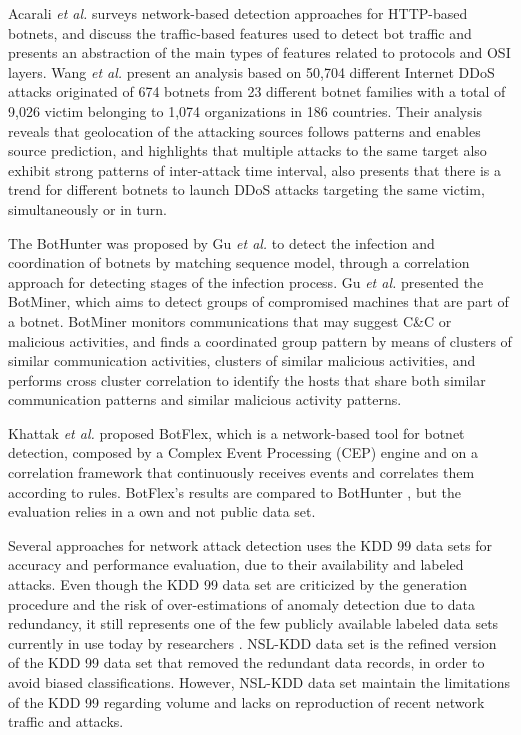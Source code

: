 Acarali \emph{et al.} \cite{acarali2016survey} surveys network-based detection approaches for HTTP-based botnets, and discuss the traffic-based features used to detect bot traffic and presents an abstraction of the main types of features related to protocols and OSI layers. Wang \emph{et al.} \cite{Wang2018ddosbotnetssurvey} present an analysis based on 50,704 different Internet DDoS attacks originated of 674 botnets from 23 different botnet families with a total of 9,026 victim belonging to 1,074 organizations in 186 countries. Their analysis reveals that geolocation of the attacking sources follows patterns and enables source prediction, and highlights that multiple attacks to the same target also exhibit strong patterns of inter-attack time interval, also presents that there is a trend for different botnets to launch DDoS attacks targeting the same victim, simultaneously or in turn.

The BotHunter was proposed by Gu \emph{et al.} \cite{gu2007bothunter} to detect the infection and coordination of botnets by matching sequence model, through a correlation approach for detecting stages of the infection process.  Gu \emph{et al.} \cite{gu2008botminer} presented the BotMiner, which aims to detect groups of compromised machines that are part of a botnet. BotMiner monitors communications that may suggest C\&C or malicious activities, and finds a coordinated group pattern by means of clusters of similar communication activities, clusters of similar malicious activities, and performs cross cluster correlation to identify the hosts that share both similar communication patterns and similar malicious activity patterns.

Khattak \emph{et al.} \cite{khattak2015botflex} proposed BotFlex, which is a network-based tool for botnet detection, composed by a Complex Event Processing (CEP) engine and on a correlation framework that continuously receives events and correlates them according to rules. BotFlex's results are compared to BotHunter \cite{gu2007bothunter}, but the evaluation relies in a own and not public data set.

Several approaches for network attack detection uses the KDD 99 \cite{ahmed2016survey,osanaiye2016distributed,bhuyan2014network} data sets for accuracy and performance evaluation, due to their availability and labeled attacks. Even though the KDD 99 data set are criticized by the generation procedure and the risk of over-estimations of anomaly detection due to data redundancy, it still represents one of the few publicly available labeled data sets currently in use today by researchers \cite{osanaiye2016distributed,bhuyan2014network}. NSL-KDD \cite{tavallaee2009detailed} data set is the refined version of the KDD 99 data set that removed the redundant data records, in order to avoid biased classifications. However, NSL-KDD data set maintain the limitations of the KDD 99 regarding volume and lacks on reproduction of recent network traffic and attacks.

